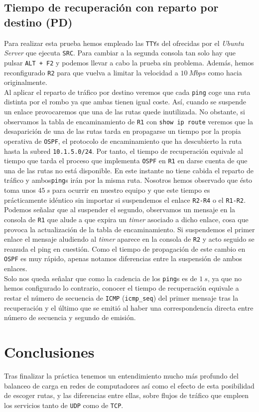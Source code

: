 \documentclass[11pt]{article}
\begin{document}
        \subsection{Tiempo de recuperación con reparto por destino (PD)}
            Para realizar esta prueba hemos empleado las \texttt{TTY}s del ofrecidas por el \textit{Ubuntu Server} que ejecuta \texttt{SRC}. Para cambiar a la segunda consola tan solo hay que pulsar \texttt{ALT + F2} y podemos llevar a cabo la prueba sin problema. Además, hemos reconfigurado \texttt{R2} para que vuelva a limitar la velocidad a $10\ Mbps$ como hacia originalmente.\\

            Al aplicar el reparto de tráfico por destino veremos que cada \texttt{ping} coge una ruta distinta por el rombo ya que ambas tienen igual coste. Así, cuando se suspende un enlace provocaremos que una de las rutas quede inutilizada. No obstante, si observamos la tabla de encaminamiento de \texttt{R1} con \texttt{show ip route} veremos que la desaparición de una de las rutas tarda en propagarse un tiempo por la propia operativa de \texttt{OSPF}, el protocolo de encaminamiento que ha descubierto la ruta hasta la subred \texttt{10.1.5.0/24}. Por tanto, el tiempo de recuperación equivale al tiempo que tarda el proceso que implementa \texttt{OSPF} en \texttt{R1} en darse cuenta de que una de las rutas no está disponible. En este instante no tiene cabida el reparto de tráfico y ambos\texttt{ping}s irán por la misma ruta. Nosotros hemos observado que ésto toma unos $45\ s$ para ocurrir en nuestro equipo y que este tiempo es prácticamente idéntico sin importar si suspendemos el enlace \texttt{R2-R4} o el \texttt{R1-R2}. Podemos señalar que al suspender el segundo, observamos un mensaje en la consola de \texttt{R1} que alude a que expira un \textit{timer} asociado a dicho enlace, cosa que provoca la actualización de la tabla de encaminamiento. Si suspendemos el primer enlace el mensaje aludiendo al \textit{timer} aparece en la consola de \texttt{R2} y acto seguido se reanuda el ping en cuestión. Como el tiempo de propagación de este cambio en \texttt{OSPF} es muy rápido, apenas notamos diferencias entre la suspensión de ambos enlaces.\\

            Solo nos queda señalar que como la cadencia de los \texttt{ping}s es de $1\ s$, ya que no hemos configurado lo contrario, conocer el tiempo de recuperación equivale a restar el número de secuencia de \texttt{ICMP} (\texttt{icmp\_seq}) del primer mensaje tras la recuperación y el último que se emitió al haber una correspondencia directa entre número de secuencia y segundo de emisión.

    \section{Conclusiones}
            Tras finalizar la práctica tenemos un entendimiento mucho más profundo del balanceo de carga en redes de computadores así como el efecto de esta posibilidad de escoger rutas, y las diferencias entre ellas, sobre flujos de tráfico que empleen los servicios tanto de \texttt{UDP} como de \texttt{TCP}.
\end{document}

